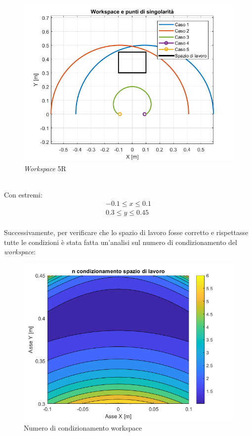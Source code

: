 \begin{figure}[ht]
	\begin{center}
		\includegraphics[scale=0.6]{Immagini/Singolarity/WorksingNew}
		\caption{\textit{Workspace} 5R}
	\end{center}
\end{figure}
\\Con estremi:
\begin{equation*}
	\begin{split}
		-0.1 \le x \le 0.1 \\
		0.3 \le y \le 0.45
	\end{split}
\end{equation*}
\\Successivamente, per verificare che lo spazio di lavoro fosse corretto e rispettasse tutte le condizioni è stata fatta un'analisi sul numero di condizionamento del \textit{workspace}:
\begin{figure}[ht]
	\begin{center}
		\includegraphics[scale=0.6]{Immagini/Singolarity/ncondsl}
		\caption{Numero di condizionamento workspace}
	\end{center}
\end{figure}
